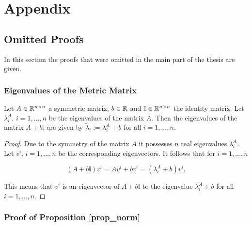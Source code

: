 \section{Appendix}

\subsection{Omitted Proofs}

In this section the proofs that were omitted in the main part of the thesis are given.

\subsubsection{Eigenvalues of the Metric Matrix}
\label{proof_eigval}

\begin{proposition}
		Let \(A \in \mathbb{R}^{n\times n}\) a symmetric matrix, \(b \in \mathbb{R}\) and \(\mathbb{I} \in \mathbb{R}^{n\times n}\) the identity matrix.
		Let \(\lambda^A_i\), \(i = 1,...,n\) be the eigenvalues of the matrix \(A\). Then the eigenvalues of the matrix \(A+b\mathbb{I}\) are given by \(\tilde{\lambda}_i := \lambda^A_i + b\) for all \(i = 1,...,n\).
\end{proposition}

\begin{proof}
	Due to the symmetry of the matrix \(A\) it possesses  \(n\) real eigenvalues \(\lambda^A_i\).
	Let \(v^i\), \(i = 1,...,n\) be the corresponding eigenvectors. It follows that for \(i = 1,...,n\)
	
	\[ (A+b\mathbb{I})v^i = Av^i+bv^i = (\lambda_i^A + b)v^i. \]
	
	This means that \(v^i\) is an eigenvector of \(A+b\mathbb{I}\) to the eigenvalue \(\lambda_i^A + b\) for all \(i = 1,...,n\).
\end{proof}

\subsubsection{Proof of Proposition \ref{prop_norm}}
\label{proof_norm}

